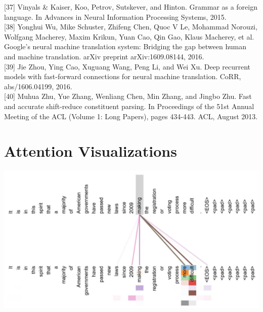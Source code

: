 \documentclass[10pt]{article}
\begin{document}
[37] Vinyals \& Kaiser, Koo, Petrov, Sutskever, and Hinton. Grammar as a foreign language. In Advances in Neural Information Processing Systems, 2015.\\[0pt]
[38] Yonghui Wu, Mike Schuster, Zhifeng Chen, Quoc V Le, Mohammad Norouzi, Wolfgang Macherey, Maxim Krikun, Yuan Cao, Qin Gao, Klaus Macherey, et al. Google's neural machine translation system: Bridging the gap between human and machine translation. arXiv preprint arXiv:1609.08144, 2016.\\[0pt]
[39] Jie Zhou, Ying Cao, Xuguang Wang, Peng Li, and Wei Xu. Deep recurrent models with fast-forward connections for neural machine translation. CoRR, abs/1606.04199, 2016.\\[0pt]
[40] Muhua Zhu, Yue Zhang, Wenliang Chen, Min Zhang, and Jingbo Zhu. Fast and accurate shift-reduce constituent parsing. In Proceedings of the 51st Annual Meeting of the ACL (Volume 1: Long Papers), pages 434-443. ACL, August 2013.

\section*{Attention Visualizations}
\begin{center}
\includegraphics[max width=\textwidth]{2024_11_26_7ad1d7977194ba7a884dg-13}
\end{center}
\end{document}
